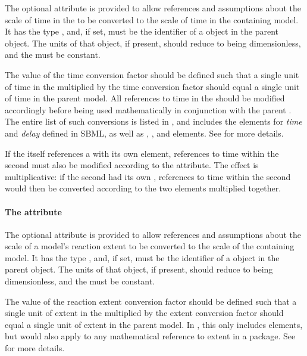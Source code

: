 The optional  attribute is provided to allow references and assumptions about the scale of time in the \Submodel to be converted to  the scale of time in the containing model.  It has the type , and, if set, must be the identifier of a \Parameter object in the  parent \Model object.  The units of that \Parameter object, if present, should reduce to being dimensionless, and the \Parameter must be constant.

The value of the time conversion factor should be defined such that a single unit of time in the \Submodel  multiplied by the time conversion factor should equal a single unit of time in the parent model. All references to time in the \Submodel should be modified accordingly before being used mathematically in conjunction with the parent \Model. The entire list of such \sbmlthreecore conversions is listed in , and includes the  elements for \emph{time} and \emph{delay} defined in SBML, as well as \Delay, \RateRule, and \KineticLaw elements.  See  for more details.

If the \Submodel itself references a \Model with its own \Submodel element, references to time within the second \Submodel must also be modified according to the  attribute.  The effect is multiplicative: if the second \Submodel had its own ,  references to time within the second \Submodel would then be converted according to the two  elements multiplied together.


\paragraph{The \fixttspace{} attribute}
\label{submodel-extentconversionfactor}

The optional  attribute is provided to allow references and assumptions about the scale of a model's reaction extent to be converted to the scale of the containing model.  It has the type , and, if set, must be the identifier of a \Parameter object in the parent \Model object.  The units of that \Parameter object, if present, should reduce to being dimensionless, and the \Parameter must be constant.

The value of the reaction extent conversion factor should be defined such that a single unit of extent in the \Submodel multiplied by the extent conversion factor should equal a single unit of extent in the parent model.  In \sbmlthreecore, this only includes \KineticLaw elements, but would also apply to any mathematical reference to extent in a package. See  for more details.

